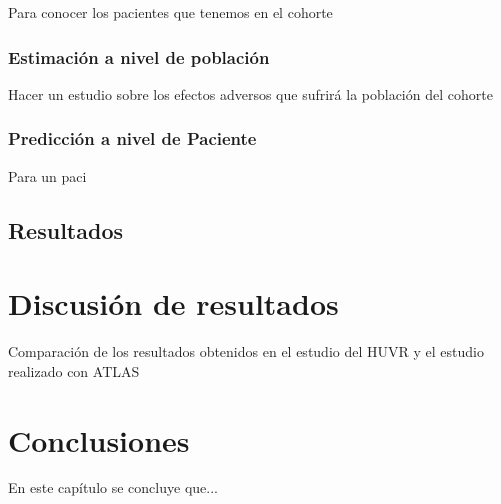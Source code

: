 Para conocer los pacientes que tenemos en el cohorte

\subsubsection{Estimación a nivel de población}

Hacer un estudio sobre los efectos adversos que sufrirá la población del cohorte

\subsubsection{Predicción a nivel de Paciente}

Para un paci

\subsection{Resultados}


\section{Discusión de resultados} \label{sec:09resultados}


Comparación de los resultados obtenidos en el estudio del HUVR y el estudio realizado con ATLAS


\section{Conclusiones} \label{sec:09conclusiones}

En este capítulo se concluye que...